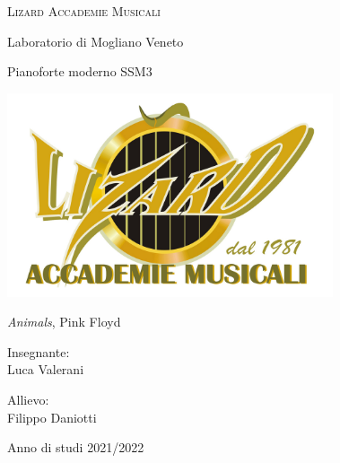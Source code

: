 \documentclass[class=book, crop=false, oneside]{standalone}
\begin{document}
    \begin{titlepage}
        \begin{center}
                
            \Huge
            \textsc{Lizard Accademie Musicali}
            
            \vspace{0.5cm}
            \LARGE
            Laboratorio di Mogliano Veneto
            
            \vspace{0.5cm}
            \large
            Pianoforte moderno SSM3
            
            \vspace{1cm}
            
            \includegraphics[width=0.72\textwidth,keepaspectratio]{logo-lizard1.jpg}   
            
            
            
            \vspace{0.5cm}
            
            \Huge{\emph{Animals}, Pink Floyd}
            
            \vspace{0.5cm}
            
            
        \end{center}  
        
        \raggedright
        
        \Large
        Insegnante:
        \vspace{0.2cm}\\
        \Large
        Luca Valerani
        
        \raggedleft
        
        \Large
        Allievo:
        \vspace{0.125cm}\\
        \Large
        Filippo Daniotti
        
        
        
        \begin{center}
            \vspace{1cm}
            Anno di studi 2021/2022 
        \end{center}
        
    \end{titlepage}
\end{document}
